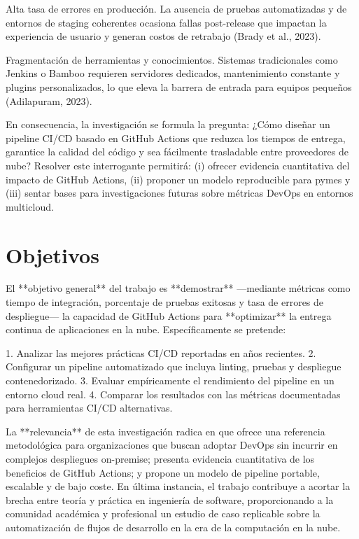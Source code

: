 Alta tasa de errores en producción. La ausencia de pruebas automatizadas y de entornos de staging coherentes ocasiona fallas post-release que impactan la experiencia de usuario y generan costos de retrabajo (Brady et al., 2023).

Fragmentación de herramientas y conocimientos. Sistemas tradicionales como Jenkins o Bamboo requieren servidores dedicados, mantenimiento constante y plugins personalizados, lo que eleva la barrera de entrada para equipos pequeños (Adilapuram, 2023).

En consecuencia, la investigación se formula la pregunta: ¿Cómo diseñar un pipeline CI/CD basado en GitHub Actions que reduzca los tiempos de entrega, garantice la calidad del código y sea fácilmente trasladable entre proveedores de nube? Resolver este interrogante permitirá: (i) ofrecer evidencia cuantitativa del impacto de GitHub Actions, (ii) proponer un modelo reproducible para pymes y (iii) sentar bases para investigaciones futuras sobre métricas DevOps en entornos multicloud.

\section{Objetivos}

El **objetivo general** del trabajo es **demostrar** —mediante métricas como tiempo de integración, porcentaje de pruebas exitosas y tasa de errores de despliegue— la capacidad de GitHub Actions para **optimizar** la entrega continua de aplicaciones en la nube. Específicamente se pretende:

1. Analizar las mejores prácticas CI/CD reportadas en años recientes.
2. Configurar un pipeline automatizado que incluya linting, pruebas y despliegue contenedorizado.
3. Evaluar empíricamente el rendimiento del pipeline en un entorno cloud real.
4. Comparar los resultados con las métricas documentadas para herramientas CI/CD alternativas.

La **relevancia** de esta investigación radica en que ofrece una referencia metodológica para organizaciones que buscan adoptar DevOps sin incurrir en complejos despliegues on-premise; presenta evidencia cuantitativa de los beneficios de GitHub Actions; y propone un modelo de pipeline portable, escalable y de bajo coste. 
En última instancia, el trabajo contribuye a acortar la brecha entre teoría y práctica en ingeniería de software, proporcionando a la comunidad académica y profesional un estudio de caso replicable sobre la automatización de flujos de desarrollo en la era de la computación en la nube.

